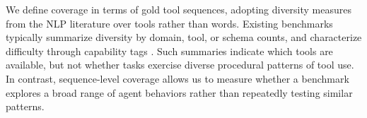 We define coverage in terms of gold tool sequences, adopting diversity measures from the NLP literature \citep{raven2023mccoy, evaluatingnovelty24merrill, standardizingdiversity24shaib, evaluatingdiversity21tevet} over tools rather than words. Existing benchmarks typically summarize diversity by domain, tool, or schema counts, and characterize difficulty through capability tags \citep{toolllm24qin, mcpverse25lei, toolsandbox25lu, tripbench26Shen}. Such summaries indicate which tools are available, but not whether tasks exercise diverse procedural patterns of tool use. In contrast, sequence-level coverage allows us to measure whether a benchmark explores a broad range of agent behaviors rather than repeatedly testing similar patterns.




